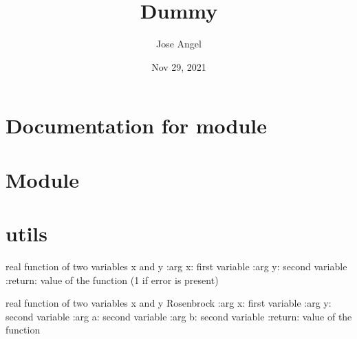 \documentclass[letterpaper,10pt,english]{sphinxmanual}
\title{Dummy }
\date{Nov 29, 2021}
\author{Jose Angel}
\begin{document}
\pagestyle{empty}
\sphinxmaketitle
\pagestyle{plain}
\sphinxtableofcontents
\pagestyle{normal}
\label{\detokenize{index::doc}}



\chapter{Documentation for module}
\label{\detokenize{index:documentation-for-module}}

\chapter{Module}
\label{\detokenize{index:module-src}}\label{\detokenize{index:module}}

\chapter{utils}
\label{\detokenize{index:module-src.utils}}\label{\detokenize{index:utils}}\label{\detokenize{index:module-0}}

\begin{fulllineitems}
\label{\detokenize{index:src.utils.function}}
real function of two variables x and y
:arg x: first variable
:arg y: second variable
:return: value of the function (\sphinxhyphen{}1 if error is present)

\end{fulllineitems}


\begin{fulllineitems}
\label{\detokenize{index:src.utils.rosembrock}}
real function of two variables x and y Rosenbrock
:arg x: first variable
:arg y: second variable
:arg a: second variable
:arg b: second variable
:return: value of the function

\end{fulllineitems}
\end{document}
